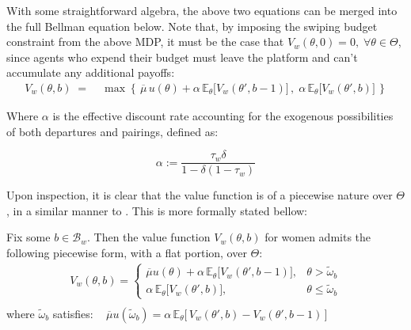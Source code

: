 With some straightforward algebra, the above two equations can be merged into the full Bellman equation below. Note that, by imposing the swiping budget constraint from the above MDP, it must be the case that $V_w(\theta, 0)=0, \; \forall \theta \in \Theta$, since agents who expend their budget must leave the platform and can't accumulate any additional payoffs: 
\begin{equation}
    \begin{aligned} 
        V_w(\theta,b) \;=\;&\max\left\{\,\overline{\mu} \, u(\theta) +\alpha \,\mathbb{E}_\theta \Big[V_w(\theta', b-1)\Big]\,,\; \alpha\,\mathbb{E}_\theta \Big[ V_w(\theta', b)\Big]\,\right\}
    \end{aligned}
\end{equation}

Where $\alpha$ is the effective discount rate accounting for the exogenous possibilities of both departures and pairings, defined as: 

\begin{equation*}
\alpha:=\frac{\tau_w\delta}{1-\delta(1-\tau_w)}
\end{equation*}

Upon inspection, it is clear that the value function is of a piecewise nature over $\Theta$, in a similar manner to \cite{mccall1970economics}. This is more formally stated bellow:


\begin{proposition}\label{prop:piecewiseV}
Fix some $b\in\mathcal{B}_w$. Then the value function $V_w(\theta,b)$ for women admits the following piecewise form, with a flat portion, over $\Theta$:  
\begin{equation*}
    \begin{split}
        V_w(\theta,b)=\begin{cases}
            \overline\mu u(\theta) +\alpha \,\mathbb{E}_{\theta}\Big[V_w(\theta', b-1)\Big],& \theta> \widetilde \omega_b \\[10pt]
            \alpha \,\mathbb{E}_{\theta}\Big[V_w(\theta', b)\Big],& \theta\leq\widetilde \omega_b
        \end{cases}\\[8pt]  
    \end{split}
\end{equation*}
where $\widetilde{\omega}_b$ satisfies:$ \quad \, \overline\mu u(\widetilde\omega_b) = \alpha \, \mathbb{E}_\theta\Big[\,V_w(\theta',b)-V_w(\theta',b-1)\,\Big]$
\end{proposition}  

